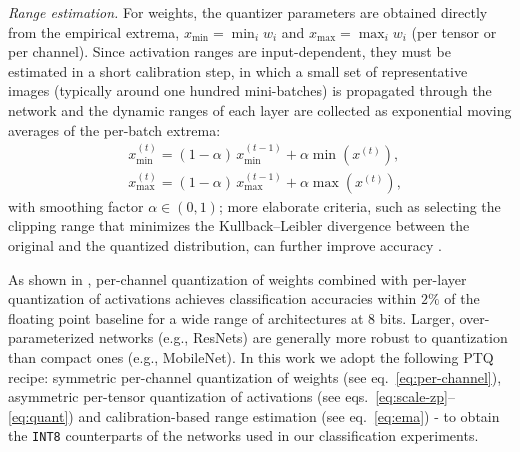 \documentclass[lettersize,journal]{IEEEtran}
\begin{document}
\medskip
\noindent\textit{Range estimation.}
For weights, the quantizer parameters are obtained directly from the
empirical extrema, $x_{\min} = \min_i w_i$ and $x_{\max} = \max_i w_i$
(per tensor or per channel). Since activation ranges are input-dependent, they must be estimated in a short {calibration} step, in which a small set of representative images (typically around one hundred mini-batches) is propagated through the network and the dynamic ranges of each layer are collected   as exponential moving averages of the per-batch  extrema:
\begin{align}
&x_{\min}^{(t)} = (1-\alpha)\, x_{\min}^{(t-1)} + \alpha \min(x^{(t)}), \nonumber \\
&x_{\max}^{(t)} = (1-\alpha)\, x_{\max}^{(t-1)} + \alpha \max(x^{(t)}),
\label{eq:ema}
\end{align}
with smoothing factor $\alpha \in (0,1)$; more elaborate criteria, such
as selecting the clipping range that minimizes the Kullback--Leibler
divergence between the original and the quantized distribution, can
further improve accuracy \cite{krishnamoorthi2018quantizing}. 

\medskip
\noindent As shown in \cite{krishnamoorthi2018quantizing}, per-channel
quantization of weights combined with per-layer quantization of
activations achieves classification accuracies within $2\%$ of the
floating point baseline for a wide range of architectures at $8$ bits. 
Larger, over-parameterized networks (e.g., ResNets) are generally more robust
to quantization than compact ones (e.g., MobileNet). In this work we adopt the following PTQ recipe: symmetric per-channel quantization of weights (see eq.~\eqref{eq:per-channel}), asymmetric per-tensor quantization of
activations (see eqs.~\eqref{eq:scale-zp}--\eqref{eq:quant}) and
calibration-based range estimation (see eq.~\eqref{eq:ema}) - to obtain the
\texttt{INT8} counterparts of the networks used in our classification
experiments. 
\end{document}
